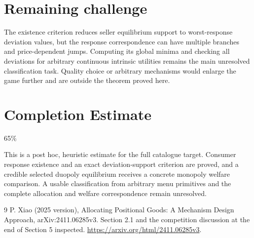 \documentclass[11pt]{article}
\begin{document}
\section*{Remaining challenge}
The existence criterion reduces seller equilibrium support to worst-response deviation values, but the response correspondence can have multiple branches and price-dependent jumps. Computing its global minima and checking all deviations for arbitrary continuous intrinsic utilities remains the main unresolved classification task. Quality choice or arbitrary mechanisms would enlarge the game further and are outside the theorem proved here.

\section{Completion Estimate}
65\%

This is a post hoc, heuristic estimate for the full catalogue target.
Consumer response existence and an exact deviation-support criterion are proved, and a credible selected duopoly equilibrium receives a concrete monopoly welfare comparison. A usable classification from arbitrary menu primitives and the complete allocation and welfare correspondence remain unresolved.

\begin{thebibliography}{9}
 P. Xiao (2025 version), Allocating Positional Goods: A Mechanism Design Approach, arXiv:2411.06285v3. Section 2.1 and the competition discussion at the end of Section 5 inspected. \url{https://arxiv.org/html/2411.06285v3}.
\end{thebibliography}
\end{document}
